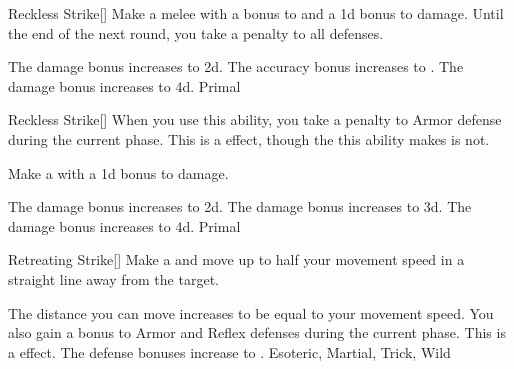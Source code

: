 \lowercase{\hypertarget{maneuver:Reckless Strike}{}}\label{maneuver:Reckless Strike}
\hypertarget{maneuver:Reckless Strike}{}
\begin{freeability}[Rank 1]{Reckless Strike}[]
Make a melee  with a  bonus to  and a \plus1d bonus to damage.
Until the end of the next round, you take a  penalty to all defenses.

\rankline
{} The damage bonus increases to \plus2d.
 The accuracy bonus increases to .
 The damage bonus increases to \plus4d.
 Primal
\end{freeability}
\vspace{0.25em}



\lowercase{\hypertarget{maneuver:Reckless Strike}{}}\label{maneuver:Reckless Strike}
\hypertarget{maneuver:Reckless Strike}{}
\begin{freeability}[Rank 1]{Reckless Strike}[]
When you use this ability, you take a  penalty to Armor defense during the current phase.
This is a  effect, though the  this ability makes is not.

Make a  with a \plus1d bonus to damage.

\rankline
{} The damage bonus increases to \plus2d.
 The damage bonus increases to \plus3d.
 The damage bonus increases to \plus4d.
 Primal
\end{freeability}
\vspace{0.25em}



\lowercase{\hypertarget{maneuver:Retreating Strike}{}}\label{maneuver:Retreating Strike}
\hypertarget{maneuver:Retreating Strike}{}
\begin{freeability}[Rank 1]{Retreating Strike}[]
Make a  and move up to half your movement speed in a straight line away from the target.

\rankline
{} The distance you can move increases to be equal to your movement speed.
 You also gain a  bonus to Armor and Reflex defenses during the current phase. This is a  effect.
 The defense bonuses increase to .
 Esoteric, Martial, Trick, Wild
\end{freeability}
\vspace{0.25em}



